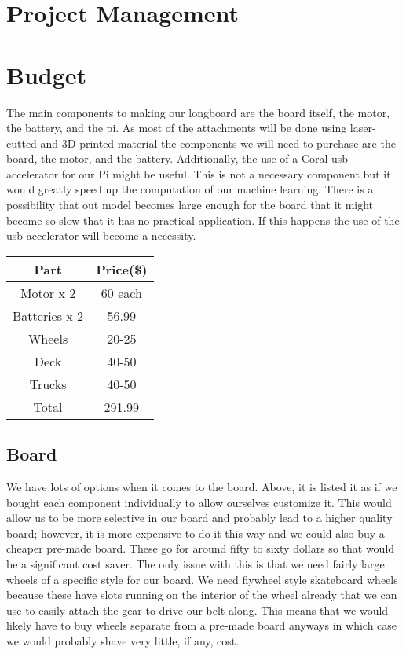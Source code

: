 \documentclass{article}
\begin{document}
\section{Project Management}



\section{Budget}
The main components to making our longboard are the board itself, the motor, the battery, and the pi. As most of the attachments will be done using laser-cutted and 3D-printed material the components we will need to purchase are the board, the motor, and the battery. Additionally, the use of a Coral usb accelerator for our Pi might be useful. This is not a necessary component but it would greatly speed up the computation of our machine learning. There is a possibility that out model becomes large enough for the board that it might become so slow that it has no practical application. If this happens the use of the usb accelerator will become a necessity.

\begin{center}
\begin{tabular}{|c|c|}
    \hline
    Part & Price(\$)  \\
    \hline
    Motor x 2 & 60 each \\
    \hline
    Batteries x 2 & 56.99\\
    \hline
    Wheels & 20-25\\
    \hline
    Deck & 40-50\\
    \hline
    Trucks & 40-50 \\
    \hline
    Total & 291.99\\
    \hline
\end{tabular}
\end{center}

\subsection{Board}
We have lots of options when it comes to the board. Above, it is listed it as if we bought each component individually to allow ourselves customize it. This would allow us to be more selective in our board and probably lead to a higher quality board; however, it is more expensive to do it this way and we could also buy a cheaper pre-made board. These go for around fifty to sixty dollars so that would be a significant cost saver. The only issue with this is that we need fairly large wheels of a specific style for our board. We need flywheel style skateboard wheels because these have slots running on the interior of the wheel already that we can use to easily attach the gear to drive our belt along. This means that we would likely have to buy wheels separate from a pre-made board anyways in which case we would probably shave very little, if any, cost. 
\end{document}
